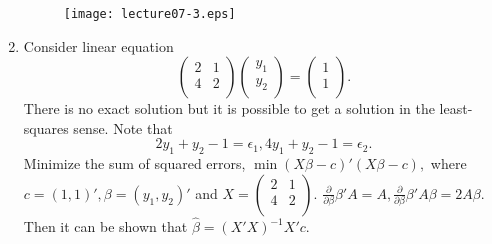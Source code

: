 \documentclass[10pt,twocolumn]{article} %
\begin{document}
\begin{enumerate}
\begin{figure}
\centering
\renewcommand{\baselinestretch}{1}
\texttt{[image: lecture07-3.eps]}
\end{figure}

\item Consider linear equation
$$\left(%
\begin{array}{cc}
  2 & 1 \\
  4 & 2 \\
\end{array}%
\right)\left(%
\begin{array}{c}
  y_1 \\
  y_2 \\
\end{array}%
\right) = \left(%
\begin{array}{c}
  1 \\
  1 \\
\end{array}%
\right).$$ There is no exact solution but it is possible to get a
solution in the least-squares sense. Note that
$$2y_1 + y_2 -1 = \epsilon_1, 4y_1 + y_2 -1 = \epsilon_2.$$
Minimize the sum of squared errors, $\min (X\beta -c)'(X\beta-c),$
where $c=(1,1)', \beta=(y_1,y_2)'$ and $X=\left(%
\begin{array}{cc}
  2 & 1 \\
  4 & 2 \\
\end{array}%
\right).$ $\frac{\partial}{\partial \beta} \beta'A = A,
\frac{\partial}{\partial \beta} \beta'A\beta = 2A\beta.$ Then it
can be shown that $\hat \beta = (X'X)^{-1}X'c$.
\end{enumerate}
\end{document}
